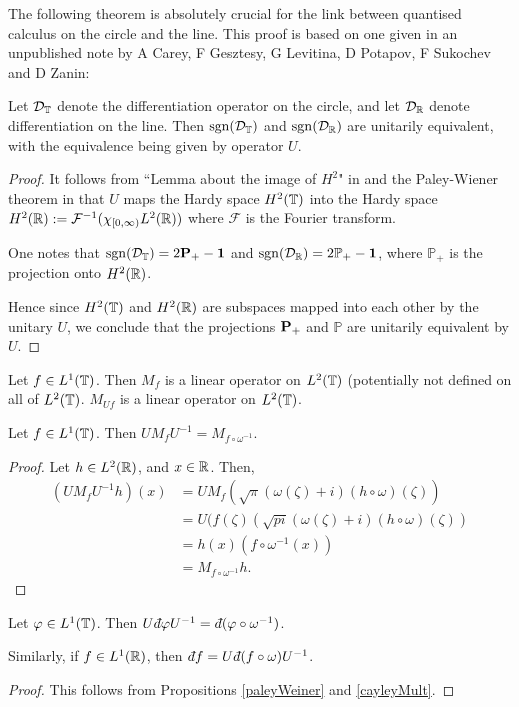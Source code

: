 The following theorem is absolutely crucial for the link
between quantised calculus on the circle and the line.
This proof is based on one given in an unpublished note by A
Carey, F Gesztesy, G Levitina, D Potapov, F Sukochev and D Zanin:
\begin{proposition}
\label{paleyWeiner}
    Let $\mathcal{D}_{\mathbb{T}}$ denote the differentiation operator on the circle,
    and let $\mathcal{D}_{\mathbb{R}}$ denote differentiation on the line. Then $\operatorname{sgn}(\mathcal{D}_{\mathbb{T}})$
    and $\operatorname{sgn}(\mathcal{D}_{\mathbb{R}})$ are unitarily equivalent, with the equivalence being
    given by operator $U$.
    
\end{proposition}
\begin{proof}
    It follows from ``Lemma about the image of $H^2$" in \cite[p. 253]{nikolskii}
    and the Paley-Wiener theorem in \cite[p.254]{nikolskii}
    that $U$ maps the Hardy space $H^2(\mathbb{T})$
    into the Hardy space $H^2(\mathbb{R}) := \mathcal{F}^{-1}(\chi_{[0,\infty)}L^2(\mathbb{R}))$
    where $\mathcal{F}$ is the Fourier transform. 
    
    One notes that $\operatorname{sgn}(\mathcal{D}_{\mathbb{T}}) = 2\mathbf{P}_+-\mathbf{1}$ and $\operatorname{sgn}(\mathcal{D}_{\mathbb{R}}) = 2\mathbb{P}_+-\mathbf{1}$,
    where $\mathbb{P}_+$ is the projection onto $H^2(\mathbb{R})$. 
    
    Hence since $H^2(\mathbb{T})$ and $H^2(\mathbb{R})$ are subspaces mapped into each other
    by the unitary $U$, we conclude that the projections $\mathbf{P}_+$
    and $\mathbb{P}$
    are unitarily equivalent by $U$.
\end{proof} 

\begin{remark}
    Let $f \in L^1(\mathbb{T})$. Then $M_f$ is a
    linear operator on $L^2(\mathbb{T})$ (potentially not defined
    on all of $L^2(\mathbb{T})$. $M_{Uf}$ is a linear operator on
    $L^2(\mathbb{T})$.
\end{remark}

\begin{proposition}
\label{cayleyMult}
    Let $f \in L^1(\mathbb{T})$. Then $UM_fU^{-1} = M_{f\circ\omega^{-1}}$. 
\end{proposition}
\begin{proof}
    Let $h \in L^2(\mathbb{R})$, and $x \in \mathbb{R}$. Then,
    \begin{align}
        (UM_fU^{-1}h)(x) &= UM_f(\sqrt{\pi}(\omega(\zeta)+i)(h\circ\omega)(\zeta))\\
        &= U(f(\zeta)(\sqrt{pi}(\omega(\zeta)+i)(h\circ\omega)(\zeta))\\
        &= h(x)(f\circ\omega^{-1}(x))\\
        &= M_{f\circ \omega^{-1}}h.
    \end{align}
\end{proof}

\begin{proposition}
\label{cayley}
    Let $\varphi \in L^1(\mathbb{T})$. Then $U\qd \varphi U^{-1} = \qd (\varphi\circ \omega^{-1})$.
    
    Similarly, if $f \in L^1(\mathbb{R})$, then $\qd f = U\qd (f\circ\omega) U^{-1}$.
\end{proposition}
\begin{proof}
    This follows from Propositions \ref{paleyWeiner} and \ref{cayleyMult}.
\end{proof}

